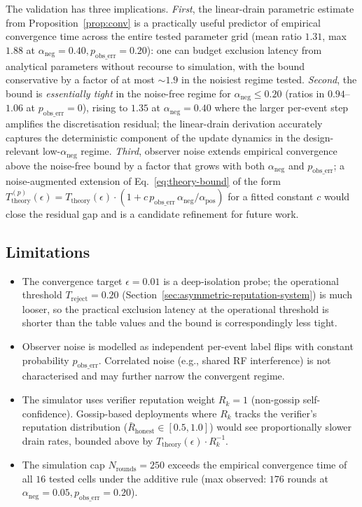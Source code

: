 \documentclass[journal,10pt,twocolumn]{IEEEtran}
\begin{document}
The validation has three implications. \emph{First}, the linear-drain
parametric estimate from Proposition~\ref{prop:conv} is a practically useful
predictor of empirical convergence time across the entire tested
parameter grid (mean ratio $1.31$, max $1.88$ at
$\alpha_\text{neg}=0.40, p_\text{obs\_err}=0.20$): one can budget
exclusion latency from analytical parameters without recourse to
simulation, with the bound conservative by a factor of at most $\sim
1.9$ in the noisiest regime tested. \emph{Second}, the bound is
\emph{essentially tight} in the noise-free regime for $\alpha_\text{neg} \leq 0.20$
(ratios in $0.94$--$1.06$ at $p_\text{obs\_err}=0$), rising to $1.35$ at
$\alpha_\text{neg}=0.40$ where the larger per-event step amplifies the
discretisation residual; the linear-drain derivation accurately captures
the deterministic component of the update dynamics in the design-relevant
low-$\alpha_\text{neg}$ regime. \emph{Third}, observer noise extends
empirical convergence above the noise-free bound by a factor that
grows with both $\alpha_\text{neg}$ and $p_\text{obs\_err}$; a
noise-augmented extension of Eq.~\ref{eq:theory-bound} of the form
$T_\text{theory}^{(p)}(\epsilon) = T_\text{theory}(\epsilon) \cdot
(1 + c\, p_\text{obs\_err}\, \alpha_\text{neg}/\alpha_\text{pos})$
for a fitted constant $c$ would close the residual gap and is a
candidate refinement for future work.

\subsection{Limitations}

\begin{itemize}
  \item The convergence target $\epsilon = 0.01$ is a deep-isolation
    probe; the operational threshold $T_\text{reject} = 0.20$
    (Section~\ref{sec:asymmetric-reputation-system}) is much looser,
    so the practical exclusion latency at the operational threshold
    is shorter than the table values and the bound is correspondingly
    less tight.
  \item Observer noise is modelled as independent per-event label flips
    with constant probability $p_\text{obs\_err}$. Correlated noise
    (e.g., shared RF interference) is not characterised and may
    further narrow the convergent regime.
  \item The simulator uses verifier reputation weight $R_k=1$
    (non-gossip self-confidence). Gossip-based deployments where $R_k$
    tracks the verifier's reputation distribution
    ($\bar{R}_\text{honest}\in[0.5,1.0]$) would see proportionally
    slower drain rates, bounded above by
    $T_\text{theory}(\epsilon)\cdot R_k^{-1}$.
  \item The simulation cap $N_\text{rounds} = 250$ exceeds the
    empirical convergence time of all $16$ tested cells under the
    additive rule (max observed: $176$ rounds at
    $\alpha_\text{neg}=0.05, p_\text{obs\_err}=0.20$).
\end{itemize}
\end{document}
